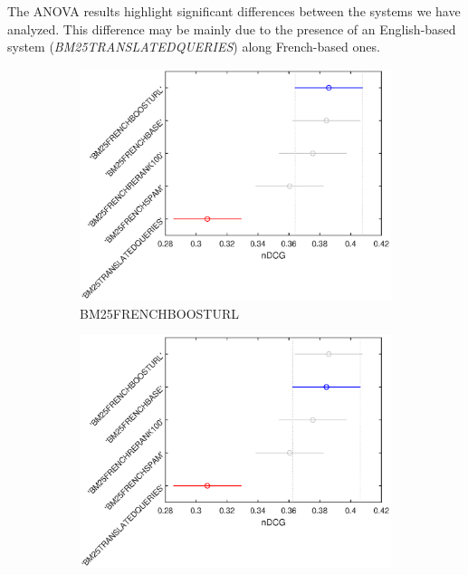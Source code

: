 The ANOVA results highlight significant differences between the systems we have analyzed. This difference may be mainly due to the presence of an English-based system (\textit{BM25TRANSLATEDQUERIES}) along French-based ones.
\begin{figure}[p]
     \centering
     \begin{subfigure}[b]{0.49\textwidth}
         \centering
         \includegraphics[width=\textwidth]{figure/heldout/tukeyhsd-1.eps}
         \caption{BM25FRENCHBOOSTURL}
         \label{fig:wthsd1}
     \end{subfigure}
     \hfill
     \begin{subfigure}[b]{0.49\textwidth}
         \centering
         \includegraphics[width=\textwidth]{figure/heldout/tukeyhsd-2.eps}

\end{subfigure}
\end{figure}
